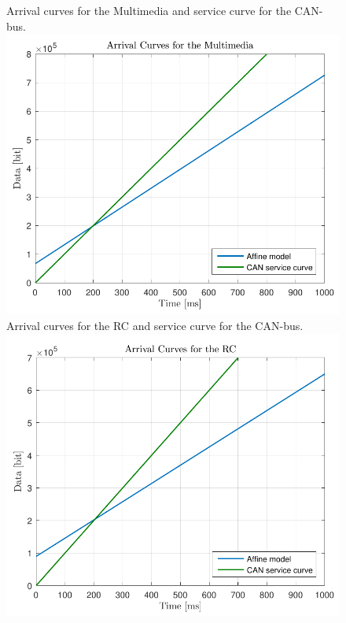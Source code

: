 \begin{figure}[H]
  \captionbox
  {
    Arrival curves for the Multimedia and service curve for the CAN-bus.
    \label{fig:ArrivalCurvesMultimedia}
  }
  {
    \includegraphics[width=.46\textwidth]{figures/ArrivalCurvesMultimedia}
  }
  \hspace{5pt}
  \captionbox
  {
    Arrival curves for the RC and service curve for the CAN-bus.
    \label{fig:ArrivalCurvesRC}
  }
  {
    \includegraphics[width=.46\textwidth]{figures/ArrivalCurvesRC}
  }
\end{figure}
%


\printbibliography
